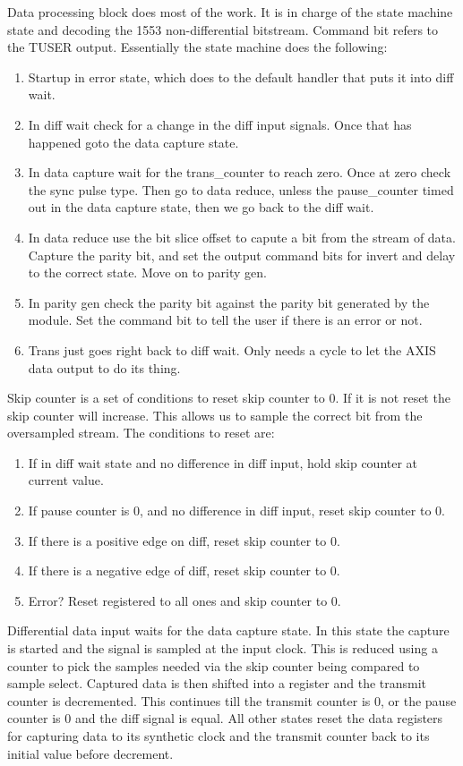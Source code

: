 \par
Data processing block does most of the work. It is in charge of the state machine state and decoding the 1553 non-differential bitstream. Command bit refers to the TUSER output. Essentially
the state machine does the following:
\begin{enumerate}
\item Startup in error state, which does to the default handler that puts it into diff wait.
\item In diff wait check for a change in the diff input signals. Once that has happened goto the data capture state.
\item In data capture wait for the trans\_counter to reach zero. Once at zero check the sync pulse type. Then go to data reduce, unless the pause\_counter timed out in the data capture state, then we go back to the diff wait.
\item In data reduce use the bit slice offset to capute a bit from the stream of data. Capture the parity bit, and set the output command bits for invert and delay to the correct state. Move on to parity gen.
\item In parity gen check the parity bit against the parity bit generated by the module. Set the command bit to tell the user if there is an error or not.
\item Trans just goes right back to diff wait. Only needs a cycle to let the AXIS data output to do its thing.
\end{enumerate}

\par
Skip counter is a set of conditions to reset skip counter to 0. If it is not reset the skip counter will increase. This allows us to sample the
correct bit from the oversampled stream. The conditions to reset are:
\begin{enumerate}
\item If in diff wait state and no difference in diff input, hold skip counter at current value.
\item If pause counter is 0, and no difference in diff input, reset skip counter to 0.
\item If there is a positive edge on diff, reset skip counter to 0.
\item If there is a negative edge of diff, reset skip counter to 0.
\item Error? Reset registered to all ones and skip counter to 0.
\end{enumerate}

\par
Differential data input waits for the data capture state. In this state the capture is started and the signal is sampled at the input clock. This is reduced using
a counter to pick the samples needed via the skip counter being compared to sample select. Captured data is then shifted into a register and the transmit counter
is decremented. This continues till the transmit counter is 0, or the pause counter is 0 and the diff signal is equal. All other states reset the data registers
for capturing data to its synthetic clock and the transmit counter back to its initial value before decrement.

